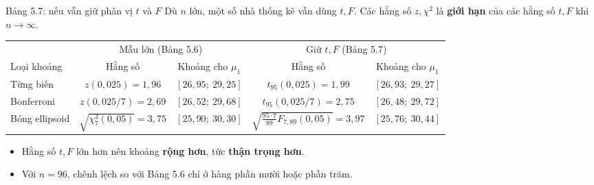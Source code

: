 \begin{frame}{Bảng 5.7: nếu vẫn giữ phân vị \texorpdfstring{\(t\)}{t} và \texorpdfstring{\(F\)}{F}}
  Dù \(n\) lớn, một số nhà thống kê vẫn dùng \(t, F\). Các hằng số \(z, \chi^2\) là
  \textbf{giới hạn} của các hằng số \(t, F\) khi \(n\to\infty\).
  \vspace{0.1cm}
  \begin{center}
    \small
    \setlength{\tabcolsep}{4pt}
    \begin{tabular}{@{}l cc cc@{}}
      \toprule
      & \multicolumn{2}{c}{Mẫu lớn (Bảng 5.6)} & \multicolumn{2}{c}{Giữ \(t, F\) (Bảng 5.7)} \\
      \cmidrule(lr){2-3}\cmidrule(lr){4-5}
      Loại khoảng & Hằng số & Khoảng cho \(\mu_1\) & Hằng số & Khoảng cho \(\mu_1\) \\
      \midrule
      Từng biến      & \(z(0{,}025)=1{,}96\)          & \([26{,}95;\ 29{,}25]\) & \(t_{95}(0{,}025)=1{,}99\)   & \([26{,}93;\ 29{,}27]\) \\
      Bonferroni     & \(z(0{,}025/7)=2{,}69\)        & \([26{,}52;\ 29{,}68]\) & \(t_{95}(0{,}025/7)=2{,}75\) & \([26{,}48;\ 29{,}72]\) \\
      Bóng ellipsoid & \(\sqrt{\chi^2_7(0{,}05)}=3{,}75\) & \([25{,}90;\ 30{,}30]\) & \(\sqrt{\tfrac{95\cdot 7}{89}F_{7,89}(0{,}05)}=3{,}97\) & \([25{,}76;\ 30{,}44]\) \\
      \bottomrule
    \end{tabular}
  \end{center}
  \vspace{0.05cm}
  \begin{itemize}
    \item Hằng số \(t, F\) lớn hơn nên khoảng \textbf{rộng hơn}, tức \textbf{thận trọng hơn}.
    \item Với \(n=96\), chênh lệch so với Bảng 5.6 chỉ ở hàng phần mười hoặc phần trăm.
  \end{itemize}
\end{frame}

